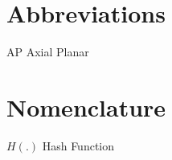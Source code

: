 \section*{Abbreviations}
\noindent
AP	\dotfill Axial Planar \\
\section*{Nomenclature}
\noindent
$H(.)$      \dotfill     Hash Function \\
